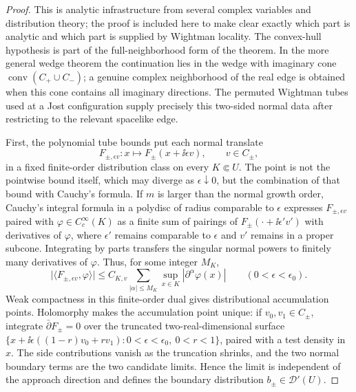 \begin{proof}
This is analytic infrastructure from several complex variables and
distribution theory; the proof is included here to make clear exactly which
part is analytic and which part is supplied by Wightman locality.  The
convex-hull hypothesis is part of the full-neighborhood form of the theorem.
In the more general wedge theorem the continuation lies in the wedge with
imaginary cone
\(\operatorname{conv}(C_+\cup C_-)\); a genuine complex neighborhood of the
real edge is obtained when this cone contains all imaginary directions.  The
permuted Wightman tubes used at a Jost configuration supply precisely this
two-sided normal data after restricting to the relevant spacelike edge.

First, the polynomial tube bounds put each normal translate
\[
  F_{\pm,\epsilon v}:x\longmapsto F_\pm(x+\ii\epsilon v),
  \qquad v\in C_\pm,
\]
in a fixed finite-order distribution class on every \(K\Subset U\).  The
point is not the pointwise bound itself, which may diverge as
\(\epsilon\downarrow0\), but the combination of that bound with Cauchy's
formula.  If \(m\) is larger than the normal growth order, Cauchy's integral
formula in a polydisc of radius comparable to \(\epsilon\) expresses
\(F_{\pm,\epsilon v}\) paired with
\(\varphi\in C_c^\infty(K)\) as a finite sum of pairings of
\(F_\pm(\cdot+\ii\epsilon'v')\) with derivatives of \(\varphi\), where
\(\epsilon'\) remains comparable to \(\epsilon\) and \(v'\) remains in a
proper subcone.  Integrating by parts transfers the singular normal powers to
finitely many derivatives of \(\varphi\).  Thus, for some integer \(M_K\),
\[
  \bigl|\langle F_{\pm,\epsilon v},\varphi\rangle\bigr|
  \le
  C_{K,v}
  \sum_{|\alpha|\le M_K}
  \sup_{x\in K}|\partial^\alpha\varphi(x)|
  \qquad(0<\epsilon<\epsilon_0).
\]
Weak compactness in this finite-order dual gives distributional accumulation
points.  Holomorphy makes the accumulation point unique: if
\(v_0,v_1\in C_\pm\), integrate \(\bar\partial F_\pm=0\) over the truncated
two-real-dimensional surface
\(\{x+\ii\epsilon((1-r)v_0+rv_1):0<\epsilon<\epsilon_0,\ 0<r<1\}\), paired
with a test density in \(x\).  The side contributions vanish as the truncation
shrinks, and the two normal boundary terms are the two candidate limits.
Hence the limit is independent of the approach direction and defines the
boundary distribution \(b_\pm\in\mathcal D'(U)\).


\end{proof}
